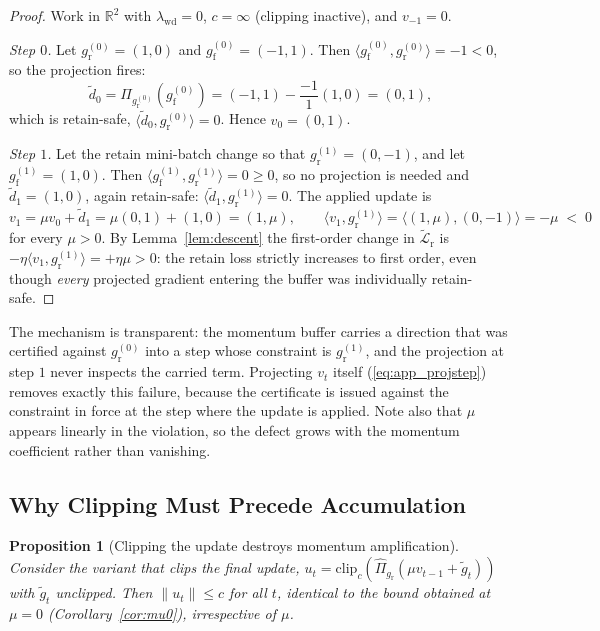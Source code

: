 \documentclass{article}
\newcommand{\gf}{g_{\mathrm{f}}}
\newcommand{\gr}{g_{\mathrm{r}}}
\newcommand{\Lrt}{\widetilde{\mathcal{L}}_{\mathrm{r}}}
\newtheorem{proposition}{Proposition}
\theoremstyle{remark}
\theoremstyle{plain}
\begin{document}
\begin{proof}
Work in $\mathbb{R}^2$ with $\lambda_{\mathrm{wd}}=0$, $c=\infty$ (clipping
inactive), and $v_{-1}=0$.

\emph{Step $0$.} Let $\gr^{(0)} = (1,0)$ and $\gf^{(0)} = (-1,1)$. Then
$\langle \gf^{(0)},\gr^{(0)}\rangle = -1 < 0$, so the projection fires:
\[
\tilde d_0 = \Pi_{\gr^{(0)}}(\gf^{(0)})
= (-1,1) - \frac{-1}{1}(1,0) = (0,1),
\]
which is retain-safe, $\langle \tilde d_0, \gr^{(0)}\rangle = 0$. Hence
$v_0 = (0,1)$.

\emph{Step $1$.} Let the retain mini-batch change so that
$\gr^{(1)} = (0,-1)$, and let $\gf^{(1)} = (1,0)$. Then
$\langle \gf^{(1)},\gr^{(1)}\rangle = 0 \ge 0$, so no projection is needed and
$\tilde d_1 = (1,0)$, again retain-safe:
$\langle \tilde d_1,\gr^{(1)}\rangle = 0$. The applied update is
\[
v_1 = \mu v_0 + \tilde d_1 = \mu(0,1) + (1,0) = (1,\mu),
\qquad
\langle v_1, \gr^{(1)}\rangle = \langle (1,\mu), (0,-1)\rangle = -\mu \;<\; 0
\]
for every $\mu>0$. By Lemma~\ref{lem:descent} the first-order change in $\Lrt$
is $-\eta\langle v_1,\gr^{(1)}\rangle = +\eta\mu > 0$: the retain loss strictly
increases to first order, even though \emph{every} projected gradient entering
the buffer was individually retain-safe.
\end{proof}

The mechanism is transparent: the momentum buffer carries a direction that was
certified against $\gr^{(0)}$ into a step whose constraint is $\gr^{(1)}$, and
the projection at step $1$ never inspects the carried term. Projecting $v_t$
itself (\ref{eq:app_projstep}) removes exactly this failure, because the
certificate is issued against the constraint in force at the step where the
update is applied. Note also that $\mu$ appears linearly in the violation, so the
defect grows with the momentum coefficient rather than vanishing.

\subsection{Why Clipping Must Precede Accumulation}\label{app:clip_order}

\begin{proposition}[Clipping the update destroys momentum amplification]\label{prop:clip}
Consider the variant that clips the final update,
$u_t = \mathrm{clip}_c(\widehat{\Pi}_{\gr}(\mu v_{t-1} + \tilde g_t))$ with
$\tilde g_t$ unclipped. Then $\|u_t\| \le c$ for all $t$, identical to the bound
obtained at $\mu=0$ (Corollary~\ref{cor:mu0}), irrespective of $\mu$.
\end{proposition}
\end{document}

